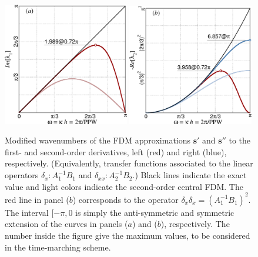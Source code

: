 \begin{figure}
\includegraphics[clip,width=0.49\textwidth]{figs/Fdm1.png}\hfill
\includegraphics[clip,width=0.49\textwidth]{figs/Fdm2.png}
\caption{Modified wavenumbers of the FDM approximations $\mathbf{s'}$ and
  $\mathbf{s''}$ to the first- and second-order derivatives, left (red) and
  right (blue), respectively. (Equivalently, transfer functions associated to
  the linear operators $\delta_{x}: A_1^{-1}B_1$ and $\delta_{xx}:
  A_2^{-1}B_2$.) Black lines indicate the exact value and light colors indicate
  the second-order central FDM. The red line in panel ($b$) corresponds to the
  operator $\delta_{x}\delta_{x} =(A_1^{-1}B_1)^2$. The interval $[-\pi,0$ is
    simply the anti-symmetric and symmetric extension of the curves in panels
    ($a$) and ($b$), respectively. The number inside the figure give the maximum
    values, to be considered in the time-marching scheme.}\label{fig:fdm}
\end{figure}

